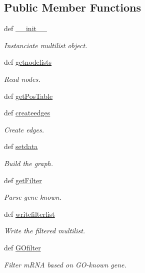\subsection*{\-Public \-Member \-Functions}
\begin{DoxyCompactItemize}
\item 
def \hyperlink{classirna_1_1David2tulip_1_1Multilist_1_1Multilist_a1bfef4c1bc34833825f8f9e270e7612a}{\-\_\-\-\_\-init\-\_\-\-\_\-}
\begin{DoxyCompactList}\small\item\em \-Instanciate multilist object. \end{DoxyCompactList}\item 
def \hyperlink{classirna_1_1David2tulip_1_1Multilist_1_1Multilist_a37db24dd0afc253fea9c238811bfa2d9}{getnodelists}
\begin{DoxyCompactList}\small\item\em \-Read nodes. \end{DoxyCompactList}\item 
def \hyperlink{classirna_1_1David2tulip_1_1Multilist_1_1Multilist_a1c5fbb0dd3a37f798dd9852fa9650448}{get\-Pos\-Table}
\item 
def \hyperlink{classirna_1_1David2tulip_1_1Multilist_1_1Multilist_a21b0217e8341998f965d9f801871e3ed}{createedges}
\begin{DoxyCompactList}\small\item\em \-Create edges. \end{DoxyCompactList}\item 
def \hyperlink{classirna_1_1David2tulip_1_1Multilist_1_1Multilist_a2792c86a3477d01f5bebd8d4dd54fba4}{setdata}
\begin{DoxyCompactList}\small\item\em \-Build the graph. \end{DoxyCompactList}\item 
def \hyperlink{classirna_1_1David2tulip_1_1Multilist_1_1Multilist_ad4756eb4aea64636aaf7145a91fd6597}{get\-Filter}
\begin{DoxyCompactList}\small\item\em \-Parse gene known. \end{DoxyCompactList}\item 
def \hyperlink{classirna_1_1David2tulip_1_1Multilist_1_1Multilist_a75b849525f61942fb0c0ef96c4d0435d}{writefilterlist}
\begin{DoxyCompactList}\small\item\em \-Write the filtered multilist. \end{DoxyCompactList}\item 
def \hyperlink{classirna_1_1David2tulip_1_1Multilist_1_1Multilist_a56d2d2571c2c6215a5af9080febb02f2}{\-G\-Ofilter}
\begin{DoxyCompactList}\small\item\em \-Filter m\-R\-N\-A based on \-G\-O-\/known gene. \end{DoxyCompactList}\end{DoxyCompactItemize}
